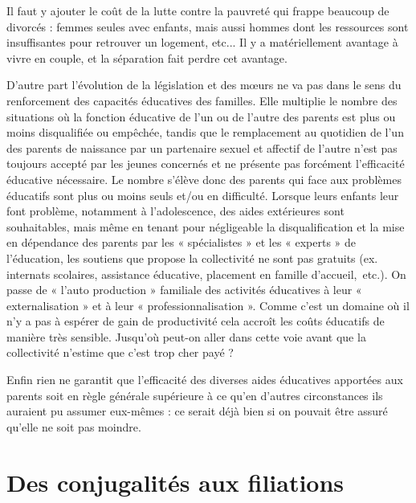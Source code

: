 Il faut y ajouter le coût de la lutte contre la pauvreté qui frappe beaucoup de divorcés : femmes seules avec enfants, mais aussi hommes dont les ressources sont insuffisantes pour retrouver un logement, etc... Il y a matériellement avantage à vivre en couple, et la séparation fait perdre cet avantage.

D'autre part l'évolution de la législation et des mœurs ne va pas dans le sens du renforcement des capacités éducatives des familles. Elle multiplie le nombre des situations où la fonction éducative de l'un ou de l'autre des parents est plus ou moins disqualifiée ou empêchée, tandis que le remplacement au quotidien de l'un des parents de naissance par un partenaire sexuel et affectif de l'autre n'est pas toujours accepté par les jeunes concernés et ne présente pas forcément l'efficacité éducative nécessaire. Le nombre s'élève donc des parents qui face aux problèmes éducatifs sont plus ou moins seuls et/ou en difficulté. Lorsque leurs enfants leur font problème, notamment à l'adolescence, des aides extérieures sont souhaitables, mais même en tenant pour négligeable la disqualification et la mise en dépendance des parents par les « spécialistes » et les « experts » de l'éducation, les soutiens que propose la collectivité ne sont pas gratuits (ex. internats scolaires, assistance éducative, placement en famille d'accueil,~etc.). On passe de « l'auto production » familiale des activités éducatives à leur « externalisation » et à leur « professionnalisation ». Comme c'est un domaine où il n'y a pas à espérer de gain de productivité cela accroît les coûts éducatifs de manière très sensible. Jusqu'où peut-on aller dans cette voie avant que la collectivité n'estime que c'est trop cher payé ? 

Enfin rien ne garantit que l'efficacité des diverses aides éducatives apportées aux parents soit en règle générale supérieure à ce qu'en d'autres circonstances ils auraient pu assumer eux-mêmes : ce serait déjà bien si on pouvait être assuré qu'elle ne soit pas moindre. 

 

\chapter{Des conjugalités aux filiations}


